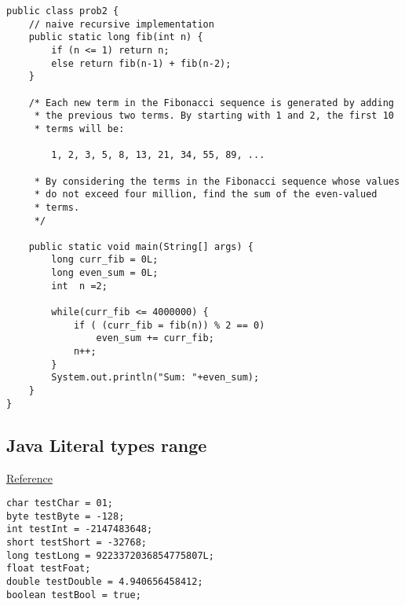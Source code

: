 \documentclass[letterpaper]{article}
\begin{document}
\begin{lstlisting}
public class prob2 {
	// naive recursive implementation
	public static long fib(int n) {
        if (n <= 1) return n;
        else return fib(n-1) + fib(n-2);
    }
	
	/* Each new term in the Fibonacci sequence is generated by adding 
	 * the previous two terms. By starting with 1 and 2, the first 10 
	 * terms will be:

		1, 2, 3, 5, 8, 13, 21, 34, 55, 89, ...

	 * By considering the terms in the Fibonacci sequence whose values 
	 * do not exceed four million, find the sum of the even-valued 
	 * terms.
	 */

	public static void main(String[] args) {
		long curr_fib = 0L;
		long even_sum = 0L;
		int  n =2;
		
		while(curr_fib <= 4000000) {
			if ( (curr_fib = fib(n)) % 2 == 0)
				even_sum += curr_fib;
			n++;
		}
		System.out.println("Sum: "+even_sum);
	}
}
\end{lstlisting}
%  

%


\subsection{Java Literal types range}
\href{http://www.jchq.net/certkey/0406certkey.htm}{Reference}
\begin{lstlisting}
char testChar = 01;
byte testByte = -128;
int testInt = -2147483648;
short testShort = -32768;
long testLong = 9223372036854775807L;
float testFoat;
double testDouble = 4.940656458412;
boolean testBool = true;
\end{lstlisting}
\end{document}

